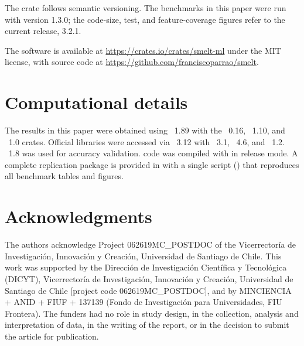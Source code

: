 \documentclass[article]{jss}
\begin{document}
The crate follows semantic versioning. The benchmarks in this paper were run
with version 1.3.0; the code-size, test, and feature-coverage figures refer to
the current release, 3.2.1.

The software is available at \url{https://crates.io/crates/smelt-ml} under the
MIT license, with source code at \url{https://github.com/franciscoparrao/smelt}.



\section*{Computational details}

The results in this paper were obtained using ~1.89 with the
~0.16, ~1.10, and ~1.0 crates. Official
 libraries were accessed via ~3.12 with
~3.1, ~4.6, and ~1.2.
~1.8 was used for accuracy validation.
 code was compiled with 
in release mode. A complete replication package is provided in
 with a single script () that
reproduces all benchmark tables and figures.


\section*{Acknowledgments}

The authors acknowledge Project 062619MC\_POSTDOC of the Vicerrector\'ia de
Investigaci\'on, Innovaci\'on y Creaci\'on, Universidad de Santiago de Chile.
This work was supported by the Direcci\'on de Investigaci\'on Cient\'ifica y
Tecnol\'ogica (DICYT), Vicerrector\'ia de Investigaci\'on, Innovaci\'on y
Creaci\'on, Universidad de Santiago de Chile [project code 062619MC\_POSTDOC],
and by MINCIENCIA + ANID + FIUF + 137139 (Fondo de Investigaci\'on para
Universidades, FIU Frontera). The funders had no role in study design, in the
collection, analysis and interpretation of data, in the writing of the report,
or in the decision to submit the article for publication.




\end{document}
